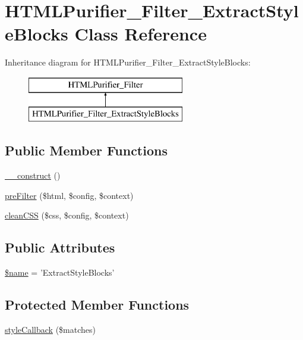 \hypertarget{classHTMLPurifier__Filter__ExtractStyleBlocks}{\section{H\+T\+M\+L\+Purifier\+\_\+\+Filter\+\_\+\+Extract\+Style\+Blocks Class Reference}
\label{classHTMLPurifier__Filter__ExtractStyleBlocks}
}
Inheritance diagram for H\+T\+M\+L\+Purifier\+\_\+\+Filter\+\_\+\+Extract\+Style\+Blocks\+:\begin{figure}[H]
\begin{center}
\leavevmode
\includegraphics[height=2.000000cm]{classHTMLPurifier__Filter__ExtractStyleBlocks}
\end{center}
\end{figure}
\subsection*{Public Member Functions}
\begin{DoxyCompactItemize}
\item 
\hyperlink{classHTMLPurifier__Filter__ExtractStyleBlocks_a250eeda1ada58dcf5afb6e8e6cd1025e}{\+\_\+\+\_\+construct} ()
\item 
\hyperlink{classHTMLPurifier__Filter__ExtractStyleBlocks_ab7d60f87d1311c0392a763984ec2fbbf}{pre\+Filter} (\$html, \$config, \$context)
\item 
\hyperlink{classHTMLPurifier__Filter__ExtractStyleBlocks_a1ba589f69cc6cbfae5df4d802b203742}{clean\+C\+S\+S} (\$css, \$config, \$context)
\end{DoxyCompactItemize}
\subsection*{Public Attributes}
\begin{DoxyCompactItemize}
\item 
\hyperlink{classHTMLPurifier__Filter__ExtractStyleBlocks_af3c579b4f5e79ab1784baf5f321daf5c}{\$name} = 'Extract\+Style\+Blocks'
\end{DoxyCompactItemize}
\subsection*{Protected Member Functions}
\begin{DoxyCompactItemize}
\item 
\hyperlink{classHTMLPurifier__Filter__ExtractStyleBlocks_ad809def32dc2b07f7765fc9df3757c08}{style\+Callback} (\$matches)
\end{DoxyCompactItemize}


